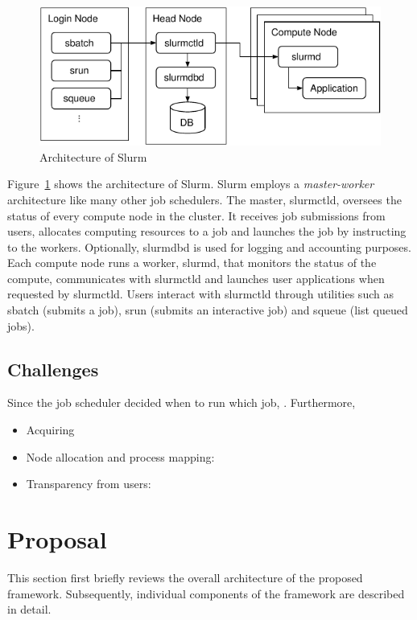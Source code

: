 \documentclass[graybox]{svmult}
\begin{document}
\begin{figure}
    \centering
    \includegraphics{slurm}
    \caption{Architecture of Slurm}%
    \label{kt:fig:slurm}
\end{figure}

Figure~\ref{kt:fig:slurm} shows the architecture of Slurm. Slurm employs a
\textit{master-worker} architecture like many other job schedulers. The
master, slurmctld, oversees the status of every compute node in the cluster.
It receives job submissions from users, allocates computing resources to a job
and launches the job by instructing to the workers. Optionally, slurmdbd is
used for logging and accounting purposes. Each compute node runs a worker,
slurmd, that monitors the status of the compute, communicates with slurmctld
and launches user applications when requested by slurmctld. Users interact
with slurmctld through utilities such as sbatch (submits a job), srun (submits
an interactive job) and squeue (list queued jobs).

\subsection{Challenges}


Since the job scheduler decided when to run which job,
. Furthermore,

\begin{itemize}
    \item Acquiring
    \item Node allocation and process mapping:
    \item Transparency from users:
\end{itemize}

\section{Proposal}\label{kt:sec:iii}

This section first briefly reviews the overall architecture of the proposed
framework. Subsequently, individual components of the framework are described
in detail.
\end{document}
